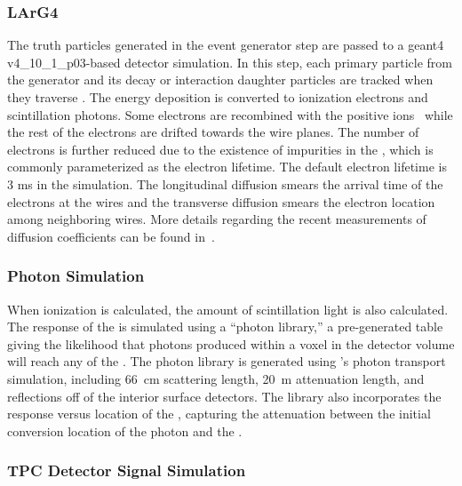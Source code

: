 \subsubsection{LArG4}\label{sec:larg4}

The truth particles generated in the event generator step are passed to a {\sc geant4} v4\_10\_1\_p03-based detector simulation. In this step, each primary particle from the generator and its decay or interaction daughter particles are tracked when they traverse \lar. The energy deposition is converted to ionization electrons and scintillation photons. Some electrons are recombined with the positive ions~\cite{Acciarri:2013met,Amoruso:2004dy} while the rest of the electrons are drifted towards the wire planes. The number of electrons is further reduced due to the existence of impurities in the \lar, which is commonly parameterized as the electron lifetime. The default electron lifetime is 3 ms in the simulation. The longitudinal diffusion smears the arrival time of the electrons at the wires and the transverse diffusion smears the electron location among neighboring wires. More details
regarding the recent measurements of diffusion coefficients can be found
in~\cite{Li:2015rqa,ref:lar_property}.

\subsubsection{Photon Simulation}

When ionization is calculated, the amount of scintillation light is also calculated. The response of the  is simulated using a ``photon library,'' a pre-generated table giving the likelihood that photons produced within a voxel in the detector volume  will reach any of the . The photon library is generated using 's photon transport simulation, including \SI{66}{cm} scattering length, \SI{20}{m} attenuation length, and reflections off of the interior surface detectors. The library also incorporates the response versus location of the , capturing the attenuation between the initial conversion location of the photon and the .

\subsubsection{TPC Detector Signal Simulation}\label{sec:tpc_sim}

